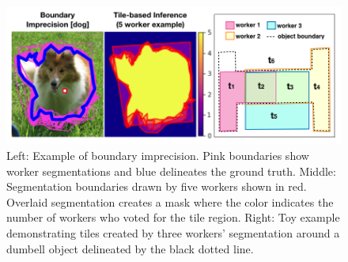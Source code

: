 \begin{figure}[h!]
\centering
\includegraphics[width=\textwidth]{plots/precision_issue_tile_example.png}
\caption{Left: Example of boundary imprecision. Pink boundaries show worker segmentations and blue delineates the ground truth. Middle: Segmentation boundaries drawn by five workers shown in red. Overlaid segmentation creates a mask where the color indicates the number of workers who voted for the tile region. Right: Toy example demonstrating tiles created by three workers' segmentation around a dumbell object delineated by the black dotted line.}
\label{tile_demo}
\setlength{\abovecaptionskip}{-10pt}
\setlength{\belowcaptionskip}{-30pt}
\end{figure}  